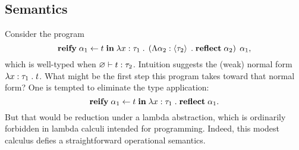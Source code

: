   \subsection{Semantics}

    Consider the program
    \[
      \textbf{reify} \; \alpha_1 \leftarrow t \; \textbf{in} \; \lambda x : \tau_1 \; . \; \left( \Lambda \alpha_2 : \left\langle \tau_2 \right\rangle \; . \; \textbf{reflect} \; \alpha_2 \right) \; \alpha_1,
    \]
    which is well-typed when $\varnothing \vdash t : \tau_2$. Intuition suggests the (weak) normal form $\lambda x : \tau_1 \; . \; t$. What might be the first step this program takes toward that normal form? One is tempted to eliminate the type application:
    \[
      \textbf{reify} \; \alpha_1 \leftarrow t \; \textbf{in} \; \lambda x : \tau_1 \; . \; \textbf{reflect} \; \alpha_1.
    \]
    But that would be reduction under a lambda abstraction, which is ordinarily forbidden in lambda calculi intended for programming. Indeed, this modest calculus defies a straightforward operational semantics.

